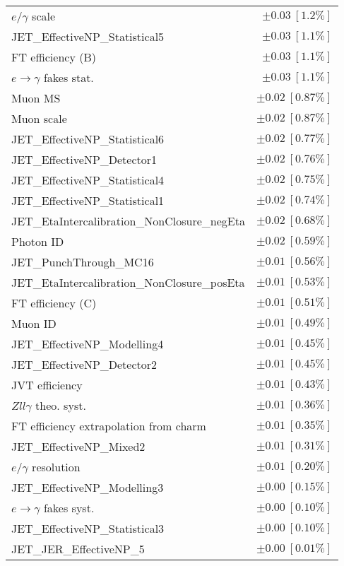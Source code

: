 \begin{tabular}{lr}
$e/\gamma$ scale & $\pm 0.03\ [1.2\%]$ \\
JET\_EffectiveNP\_Statistical5 & $\pm 0.03\ [1.1\%]$ \\
FT efficiency (B) & $\pm 0.03\ [1.1\%]$ \\
$e\to\gamma$ fakes stat. & $\pm 0.03\ [1.1\%]$ \\
Muon MS & $\pm 0.02\ [0.87\%]$ \\
Muon scale & $\pm 0.02\ [0.87\%]$ \\
JET\_EffectiveNP\_Statistical6 & $\pm 0.02\ [0.77\%]$ \\
JET\_EffectiveNP\_Detector1 & $\pm 0.02\ [0.76\%]$ \\
JET\_EffectiveNP\_Statistical4 & $\pm 0.02\ [0.75\%]$ \\
JET\_EffectiveNP\_Statistical1 & $\pm 0.02\ [0.74\%]$ \\
JET\_EtaIntercalibration\_NonClosure\_negEta & $\pm 0.02\ [0.68\%]$ \\
Photon ID & $\pm 0.02\ [0.59\%]$ \\
JET\_PunchThrough\_MC16 & $\pm 0.01\ [0.56\%]$ \\
JET\_EtaIntercalibration\_NonClosure\_posEta & $\pm 0.01\ [0.53\%]$ \\
FT efficiency (C) & $\pm 0.01\ [0.51\%]$ \\
Muon ID & $\pm 0.01\ [0.49\%]$ \\
JET\_EffectiveNP\_Modelling4 & $\pm 0.01\ [0.45\%]$ \\
JET\_EffectiveNP\_Detector2 & $\pm 0.01\ [0.45\%]$ \\
JVT efficiency & $\pm 0.01\ [0.43\%]$ \\
$Zll\gamma$ theo. syst. & $\pm 0.01\ [0.36\%]$ \\
FT efficiency extrapolation from charm & $\pm 0.01\ [0.35\%]$ \\
JET\_EffectiveNP\_Mixed2 & $\pm 0.01\ [0.31\%]$ \\
$e/\gamma$ resolution & $\pm 0.01\ [0.20\%]$ \\
JET\_EffectiveNP\_Modelling3 & $\pm 0.00\ [0.15\%]$ \\
$e\to\gamma$ fakes syst. & $\pm 0.00\ [0.10\%]$ \\
JET\_EffectiveNP\_Statistical3 & $\pm 0.00\ [0.10\%]$ \\
JET\_JER\_EffectiveNP\_5 & $\pm 0.00\ [0.01\%]$ \\
\hline
\end{tabular}
